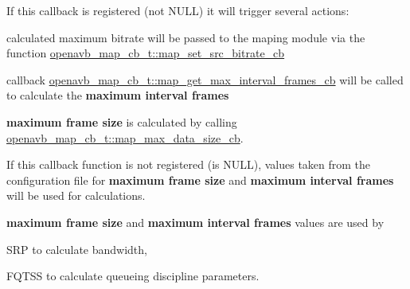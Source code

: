If this callback is registered (not N\+U\+LL) it will trigger several actions\+:
\begin{DoxyItemize}
\item calculated maximum bitrate will be passed to the maping module via the function \hyperlink{structopenavb__map__cb__t_a51d32b904dad1b9f7dd1d6169128d806}{openavb\+\_\+map\+\_\+cb\+\_\+t\+::map\+\_\+set\+\_\+src\+\_\+bitrate\+\_\+cb}
\item callback \hyperlink{structopenavb__map__cb__t_af91d6f178bc808c13b21abab3861accb}{openavb\+\_\+map\+\_\+cb\+\_\+t\+::map\+\_\+get\+\_\+max\+\_\+interval\+\_\+frames\+\_\+cb} will be called to calculate the {\bfseries maximum interval frames}
\item {\bfseries maximum frame size} is calculated by calling \hyperlink{structopenavb__map__cb__t_ac87069ceed64005bb4a3c8fbb3da8357}{openavb\+\_\+map\+\_\+cb\+\_\+t\+::map\+\_\+max\+\_\+data\+\_\+size\+\_\+cb}.
\end{DoxyItemize}

If this callback function is not registered (is N\+U\+LL), values taken from the configuration file for {\bfseries maximum frame size} and {\bfseries maximum interval frames} will be used for calculations.

{\bfseries maximum frame size} and {\bfseries maximum interval frames} values are used by
\begin{DoxyItemize}
\item S\+RP to calculate bandwidth,
\item F\+Q\+T\+SS to calculate queueing discipline parameters. 
\end{DoxyItemize}